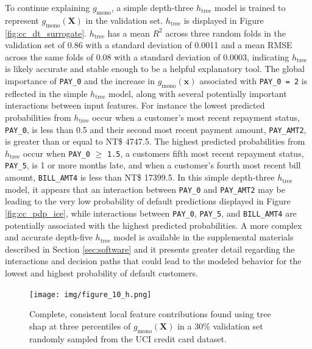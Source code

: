 \documentclass[sigconf, review]{acmart}
\begin{document}
To continue explaining $g_{\text{mono}}$, a simple depth-three $h_{\text{tree}}$ model is trained to represent  $g_{\text{mono}}(\mathbf{X})$ in the validation set. $h_{\text{tree}}$ is displayed in Figure \ref{fig:cc_dt_surrogate}. $h_{\text{tree}}$ has a mean $R^2$ across three random folds in the validation set of 0.86 with a standard deviation of 0.0011 and a mean RMSE across the same folds of 0.08 with a standard deviation of 0.0003, indicating $h_{\text{tree}}$ is likely accurate and stable enough to be a helpful explanatory tool. The global importance of \texttt{PAY\_0} and the increase in $g_{\text{mono}}(\mathbf{x})$ associated with \texttt{PAY\_0 = 2} is reflected in the simple $h_{\text{tree}}$ model, along with several potentially important interactions between input features. For instance the lowest predicted probabilities from $h_{\text{tree}}$ occur when a customer's  most recent repayment status, \texttt{PAY\_0}, is less than 0.5 and their second most recent payment amount, \texttt{PAY\_AMT2}, is greater than or equal to NT\$ 4747.5. The highest predicted probabilities from $h_{\text{tree}}$ occur when \texttt{PAY\_0} $\geq$ \texttt{1.5}, a customers fifth most recent repayment status, \texttt{PAY\_5}, is 1 or more months late, and when a customer's fourth most recent bill amount, \texttt{BILL\_AMT4} is less than NT\$ 17399.5. In this simple depth-three $h_{\text{tree}}$ model, it appears that an interaction between \texttt{PAY\_0} and \texttt{PAY\_AMT2} may be leading to the very low probability of default predictions displayed in Figure \ref{fig:cc_pdp_ice}, while interactions between \texttt{PAY\_0}, \texttt{PAY\_5}, and \texttt{BILL\_AMT4} are potentially associated with the highest predicted probabilities. A more complex and accurate depth-five $h_{\text{tree}}$ model is available in the supplemental materials described in Section \ref{sec:software} and it presents greater detail regarding the interactions and decision paths that could lead to the modeled behavior for the lowest and highest probability of default customers. 
 
\begin{figure}[htb]
	\begin{center}
		\texttt{[image: img/figure\_10\_h.png]}
		\caption{Complete, consistent local feature contributions found using tree shap at three percentiles of $g_{\text{mono}}(\mathbf{X})$ in a 30\% validation set randomly sampled from the UCI credit card dataset.}
		\label{fig:cc_shap}
	\end{center}
\end{figure}
\end{document}
